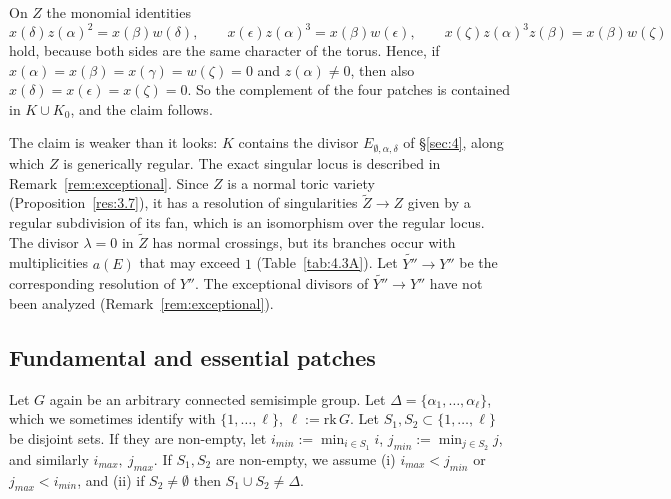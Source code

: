 \documentclass[12pt,letterpaper]{amsart}
\theoremstyle{plain}
\theoremstyle{definition}
\theoremstyle{remark}
\theoremstyle{definition}
\begin{document}
\medskip
On $Z$ the monomial identities
\[
x(\delta)z(\alpha)^2=x(\beta)w(\delta),\qquad
x(\epsilon)z(\alpha)^3=x(\beta)w(\epsilon),\qquad
x(\zeta)z(\alpha)^3z(\beta)=x(\beta)w(\zeta)
\]
hold, because both sides are
the same character of the torus. Hence, if $x(\alpha)=x(\beta)=x(\gamma)=w(\zeta)=0$
and $z(\alpha)\neq0$, then also $x(\delta)=x(\epsilon)=x(\zeta)=0$. So the
complement of the four patches is contained in $K\cup K_0$, and the claim
follows.

The claim is weaker than it looks: $K$ contains the divisor
$E_{\emptyset,\alpha,\delta}$ of \S\ref{sec:4}, along which $Z$ is
generically regular. The exact singular locus is described in
Remark~\ref{rem:exceptional}. Since $Z$ is a normal toric variety
(Proposition~\ref{res:3.7}), it has a resolution of singularities
$\tilde Z\to Z$ given by a regular subdivision of its fan, which is an
isomorphism over the regular locus. The divisor $\lambda=0$ in $\tilde Z$ has
normal crossings, but its branches occur with multiplicities $a(E)$ that may
exceed $1$ (Table~\ref{tab:4.3A}). Let $\tilde{Y''}\rightarrow Y''$ be the
corresponding resolution of $Y''$. The exceptional divisors of
$\tilde{Y''}\to Y''$ have not been analyzed (Remark~\ref{rem:exceptional}).

\subsection*{Fundamental and essential patches}

Let $G$ again be an arbitrary connected semisimple group.
Let $\Delta=\{\alpha_1,\dots,\alpha_\ell\}$, which we sometimes identify
with $\{1,\dots,\ell\}$, $\ell :=\mathrm{rk}\, G$. Let $S_1,S_2\subset \{1,\dots,\ell\}$
be disjoint sets. If they are
non-empty, let $i_{min}:=\min_{i\in S_1}i$,
$j_{min}:=\min_{j\in S_2}j$, and similarly $i_{max},\ j_{max}$. If
$S_1,S_2$ are non-empty, we assume
(i) $i_{max}<j_{min}$ or $j_{max}<i_{min}$, and (ii) if $S_2\not=\emptyset$
then $S_1\cup S_2\not=\Delta$.
\end{document}
